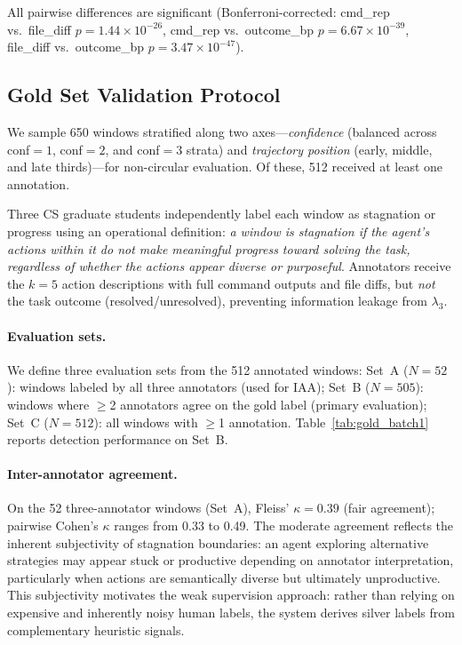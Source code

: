 All pairwise differences are significant (Bonferroni-corrected: cmd\_rep vs.\ file\_diff $p{=}1.44{\times}10^{-26}$, cmd\_rep vs.\ outcome\_bp $p{=}6.67{\times}10^{-39}$, file\_diff vs.\ outcome\_bp $p{=}3.47{\times}10^{-47}$).

\subsection{Gold Set Validation Protocol}
\label{sec:app_gold_set}

We sample 650 windows stratified along two axes---\emph{confidence} (balanced across conf${=}1$, conf${=}2$, and conf${=}3$ strata) and \emph{trajectory position} (early, middle, and late thirds)---for non-circular evaluation.
Of these, 512 received at least one annotation.

Three CS graduate students independently label each window as stagnation or progress using an operational definition: \emph{a window is stagnation if the agent's actions within it do not make meaningful progress toward solving the task, regardless of whether the actions appear diverse or purposeful}.
Annotators receive the $k{=}5$ action descriptions with full command outputs and file diffs, but \emph{not} the task outcome (resolved/unresolved), preventing information leakage from $\lambda_3$.

\paragraph{Evaluation sets.}
We define three evaluation sets from the 512 annotated windows:
Set~A ($N{=}52$): windows labeled by all three annotators (used for IAA);
Set~B ($N{=}505$): windows where ${\geq}$2 annotators agree on the gold label (primary evaluation);
Set~C ($N{=}512$): all windows with ${\geq}$1 annotation.
Table~\ref{tab:gold_batch1} reports detection performance on Set~B.

\paragraph{Inter-annotator agreement.}
\label{sec:app_iaa}
On the 52 three-annotator windows (Set~A), Fleiss' $\kappa{=}0.39$ (fair agreement); pairwise Cohen's $\kappa$ ranges from 0.33 to 0.49.
The moderate agreement reflects the inherent subjectivity of stagnation boundaries: an agent exploring alternative strategies may appear stuck or productive depending on annotator interpretation, particularly when actions are semantically diverse but ultimately unproductive.
This subjectivity motivates the weak supervision approach: rather than relying on expensive and inherently noisy human labels, the system derives silver labels from complementary heuristic signals.

